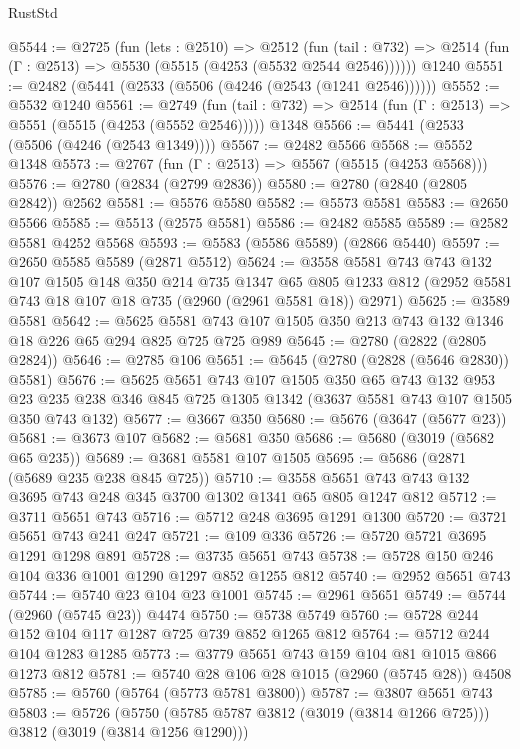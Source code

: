\begin{lexlean}{RustStd}
\begin{coremodule}
@5544 := @2725
    (fun (lets : @2510) =>
    @2512
      (fun (tail : @732) => @2514 (fun (Γ : @2513) => @5530 (@5515 (@4253 (@5532 @2544 @2546))))))
    @1240
@5551 := @2482 (@5441 (@2533 (@5506 (@4246 (@2543 (@1241 @2546))))))
@5552 := @5532 @1240
@5561 := @2749
    (fun (tail : @732) => @2514 (fun (Γ : @2513) => @5551 (@5515 (@4253 (@5552 @2546)))))
    @1348
@5566 := @5441 (@2533 (@5506 (@4246 (@2543 @1349))))
@5567 := @2482 @5566
@5568 := @5552 @1348
@5573 := @2767 (fun (Γ : @2513) => @5567 (@5515 (@4253 @5568)))
@5576 := @2780 (@2834 (@2799 @2836))
@5580 := @2780 (@2840 (@2805 @2842)) @2562
@5581 := @5576 @5580
@5582 := @5573 @5581
@5583 := @2650 @5566
@5585 := @5513 (@2575 @5581)
@5586 := @2482 @5585
@5589 := @2582 @5581 @4252 @5568
@5593 := @5583 (@5586 @5589) (@2866 @5440)
@5597 := @2650 @5585 @5589 (@2871 @5512)
@5624 := @3558
    @5581
    @743
    @743
    @132
    @107
    @1505
    @148
    @350
    @214
    @735
    @1347
    @65
    @805
    @1233
    @812
    (@2952 @5581 @743 @18 @107 @18 @735 (@2960 (@2961 @5581 @18)) @2971)
@5625 := @3589 @5581
@5642 := @5625 @5581 @743 @107 @1505 @350 @213 @743 @132 @1346 @18 @226 @65 @294 @825 @725 @725 @989
@5645 := @2780 (@2822 (@2805 @2824))
@5646 := @2785 @106
@5651 := @5645 (@2780 (@2828 (@5646 @2830)) @5581)
@5676 := @5625
    @5651
    @743
    @107
    @1505
    @350
    @65
    @743
    @132
    @953
    @23
    @235
    @238
    @346
    @845
    @725
    @1305
    @1342
    (@3637 @5581 @743 @107 @1505 @350 @743 @132)
@5677 := @3667 @350
@5680 := @5676 (@3647 (@5677 @23))
@5681 := @3673 @107
@5682 := @5681 @350
@5686 := @5680 (@3019 (@5682 @65 @235))
@5689 := @3681 @5581 @107 @1505
@5695 := @5686 (@2871 (@5689 @235 @238 @845 @725))
@5710 := @3558 @5651 @743 @743 @132 @3695 @743 @248 @345 @3700 @1302 @1341 @65 @805 @1247 @812
@5712 := @3711 @5651 @743
@5716 := @5712 @248 @3695 @1291 @1300
@5720 := @3721 @5651 @743 @241 @247
@5721 := @109 @336
@5726 := @5720 @5721 @3695 @1291 @1298 @891
@5728 := @3735 @5651 @743
@5738 := @5728 @150 @246 @104 @336 @1001 @1290 @1297 @852 @1255 @812
@5740 := @2952 @5651 @743
@5744 := @5740 @23 @104 @23 @1001
@5745 := @2961 @5651
@5749 := @5744 (@2960 (@5745 @23)) @4474
@5750 := @5738 @5749
@5760 := @5728 @244 @152 @104 @117 @1287 @725 @739 @852 @1265 @812
@5764 := @5712 @244 @104 @1283 @1285
@5773 := @3779 @5651 @743 @159 @104 @81 @1015 @866 @1273 @812
@5781 := @5740 @28 @106 @28 @1015 (@2960 (@5745 @28)) @4508
@5785 := @5760 (@5764 (@5773 @5781 @3800))
@5787 := @3807 @5651 @743
@5803 := @5726
    (@5750 (@5785 @5787 @3812 (@3019 (@3814 @1266 @725))) @3812 (@3019 (@3814 @1256 @1290)))

\end{coremodule}
\end{lexlean}
